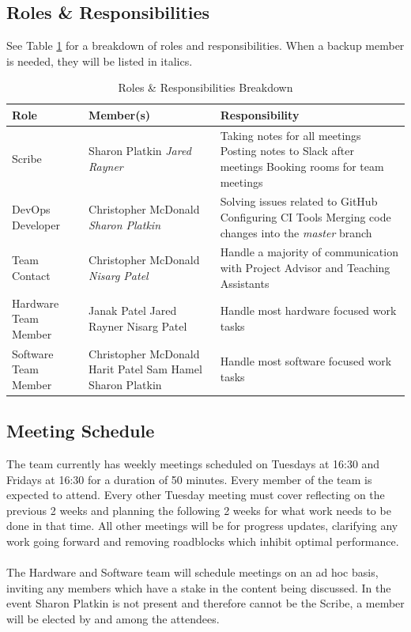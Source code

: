 \documentclass[11pt]{article}
\begin{document}
\subsection{Roles \& Responsibilities}
See Table \ref{rr} for a breakdown of roles and responsibilities. When a backup member is needed, they will be listed in italics.
\begin{table}[H] %
\centering
\caption{Roles \& Responsibilities Breakdown} 
\label{rr}
\begin{tabularx}{\textwidth}{| l | p{4cm} | X |}
\hline
Role & Member(s) & Responsibility \\ \hline
Scribe & Sharon Platkin \newline \textit{Jared Rayner} & Taking notes for all meetings \newline Posting notes to Slack after meetings \newline Booking rooms for team meetings  \\ \hline
DevOps Developer & Christopher McDonald \newline \textit{Sharon Platkin} & Solving issues related to GitHub \newline Configuring CI Tools \newline Merging code changes into the \textit{master} branch  \\ \hline
Team Contact & Christopher McDonald \newline \textit{Nisarg Patel} & Handle a majority of communication with Project Advisor and Teaching Assistants \\ \hline
Hardware Team Member & Janak Patel \newline Jared Rayner \newline Nisarg Patel & Handle most hardware focused work tasks \\ \hline
Software Team Member & Christopher McDonald \newline Harit Patel \newline Sam Hamel \newline Sharon Platkin & Handle most software focused work tasks \\ \hline
\end{tabularx}
\end{table}
\subsection{Meeting Schedule}
The team currently has weekly meetings scheduled on Tuesdays at 16:30 and Fridays at 16:30 for a duration of 50 minutes. Every member of the team is expected to attend. Every other Tuesday meeting must cover reflecting on the previous 2 weeks and planning the following 2 weeks for what work needs to be done in that time. All other meetings will be for progress updates, clarifying any work going forward and removing roadblocks which inhibit optimal performance. \\ \\
The Hardware and Software team will schedule meetings on an ad hoc basis, inviting any members which have a stake in the content being discussed. In the event Sharon Platkin is not present and therefore cannot be the Scribe, a member will be elected by and among the attendees.
\end{document}
